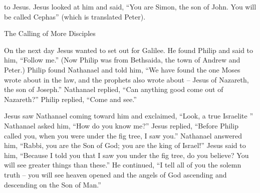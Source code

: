 {to
Jesus.
Jesus
looked at
him
and said,
“You
are
Simon,
the son
of John.
You
will be called
Cephas”
(which
is translated
Peter).
\par }{\SH The Calling of More Disciples
\par }{\PP {}On
the next day
Jesus
wanted
to set out
for
Galilee.
He
found
Philip
and
said
to him,
“Follow
me.”
(Now
Philip
was
from
Bethsaida,
the town
of Andrew
and
Peter.)
Philip
found
Nathanael
and
told
him,
“We have found
the one
Moses
wrote
about in
the law,
and
the prophets also wrote about – Jesus of Nazareth, the son of Joseph.”
Nathanael
replied, “Can
anything
good
come out
of
Nazareth?” Philip
replied, “Come
and
see.”
\par }{\PP {}Jesus
saw
Nathanael
coming
toward
him
and
exclaimed, “Look,
a true
Israelite
{}”
Nathanael
asked
him,
“How
do you know
me?” Jesus
replied, “Before
Philip
called
you,
when you were
under
the fig tree,
I saw
you.”
Nathanael
answered
him,
“Rabbi,
you
are
the Son
of God;
you
are
the king
of Israel!”
Jesus
said
to him, “Because
I told
you
that
I saw
you
under
the fig tree,
do you believe? You will see
greater things than
these.”
He continued, “I tell
all of you
the solemn truth –
you will see
heaven
opened
and
the angels
of God
ascending
and
descending
on
the Son
of Man.”

}
